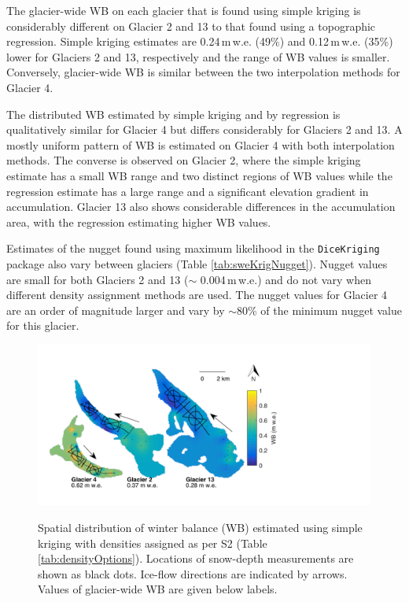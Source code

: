\documentclass{sfuthesis}
\begin{document}
The glacier-wide WB on each glacier that is found using simple kriging is considerably different on Glacier 2 and 13 to that found using a topographic regression. Simple kriging estimates are 0.24\,m\,w.e. (49\%) and 0.12\,m\,w.e. (35\%) lower for Glaciers 2 and 13, respectively and the range of WB values is smaller. Conversely, glacier-wide WB is similar between the two interpolation methods for Glacier 4.

The distributed WB estimated by simple kriging and by regression is qualitatively similar for Glacier 4 but differs considerably for Glaciers 2 and 13. A mostly uniform pattern of WB is estimated on Glacier 4 with both interpolation methods. The converse is observed on Glacier 2, where the simple kriging estimate has a small WB range and two distinct regions of WB values while the regression estimate has a large range and a significant elevation gradient in accumulation. Glacier 13 also shows considerable differences in the accumulation area, with the regression estimating higher WB values. 

Estimates of the nugget found using maximum likelihood in the \texttt{DiceKriging} package also vary between glaciers (Table \ref{tab:sweKrigNugget}). Nugget values are small for both Glaciers 2 and 13 ($\sim$ 0.004\,m\,w.e.) and do not vary when different density assignment methods are used. The nugget values for Glacier 4 are an order of magnitude larger and vary by $\sim$80\% of the minimum nugget value for this glacier. 

\begin{figure}[H]
	\centering
	\includegraphics[width =0.9 \textwidth]{SK_map.pdf}\\
	\caption{Spatial distribution of winter balance (WB) estimated using simple kriging with densities assigned as per S2 (Table \ref{tab:densityOptions}). Locations of snow-depth measurements are shown as black dots. Ice-flow directions are indicated by arrows. Values of glacier-wide WB are given below labels.}
	\label{fig:sweKRIGING}
\end{figure}
\end{document}
